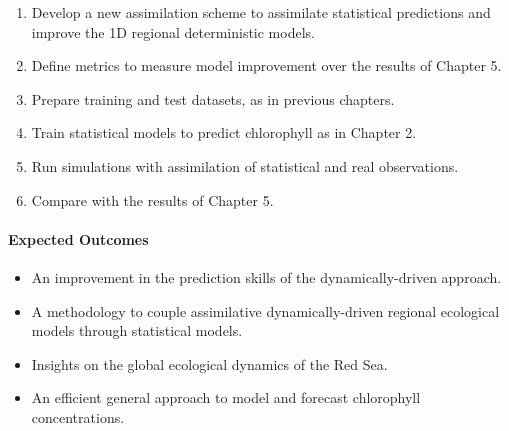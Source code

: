 \begin{enumerate}

\item Develop a new assimilation scheme to assimilate statistical predictions
and improve the 1D regional deterministic models.

\item Define metrics to measure model improvement over the results of Chapter
5.

\item Prepare training and test datasets, as in previous chapters.

\item Train statistical models to predict chlorophyll as in Chapter 2.

\item Run simulations with assimilation of statistical and real observations.

\item Compare with the results of Chapter 5.

\end{enumerate}

\paragraph{Expected Outcomes}

\begin{itemize}

\item An improvement in the prediction skills of the dynamically-driven
approach.

\item A methodology to couple assimilative dynamically-driven regional
ecological models through statistical models.

\item Insights on the global ecological dynamics of the Red Sea.

\item An efficient general approach to model and forecast chlorophyll
concentrations.

\end{itemize}
